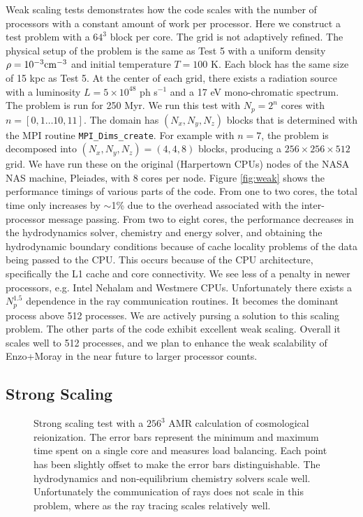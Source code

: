\documentclass[apj,onecolumn]{emulateapj}
\begin{document}
Weak scaling tests demonstrates how the code scales with the number of
processors with a constant amount of work per processor.  Here we
construct a test problem with a $64^3$ block per core.  The grid is
not adaptively refined.  The physical setup of the problem is the same
as Test 5 with a uniform density $\rho = 10^{-3} \cubecm$ and initial
temperature $T = 100$ K.  Each block has the same size of 15 kpc as
Test 5.  At the center of each grid, there exists a radiation source
with a luminosity $L = 5 \times 10^{48}$ ph s$^{-1}$ and a 17 eV
mono-chromatic spectrum.  The problem is run for 250 Myr.  We run this
test with $N_p = 2^n$ cores with $n = [0,1 \dots 10,11]$.  The domain
has $(N_x, N_y, N_z)$ blocks that is determined with the MPI routine
\texttt{MPI\_Dims\_create}.  For example with $n = 7$, the problem is
decomposed into $(N_x, N_y, N_z) = (4,4,8)$ blocks, producing a $256
\times 256 \times 512$ grid.  We have run these on the original
(Harpertown CPUs) nodes of the NASA NAS machine, Pleiades, with 8
cores per node.  Figure \ref{fig:weak} shows the performance timings
of various parts of the code.  From one to two cores, the total time
only increases by $\sim$1\% due to the overhead associated with the
inter-processor message passing.  From two to eight cores, the
performance decreases in the hydrodynamics solver, chemistry and
energy solver, and obtaining the hydrodynamic boundary conditions
because of cache locality problems of the data being passed to the
CPU.  This occurs because of the CPU architecture, specifically the L1
cache and core connectivity.  We see less of a penalty in newer
processors, e.g. Intel Nehalam and Westmere CPUs.  Unfortunately there
exists a $N_p^{1.5}$ dependence in the ray communication routines.  It
becomes the dominant process above 512 processes.  We are actively
pursing a solution to this scaling problem.  The other parts of the
code exhibit excellent weak scaling.  Overall it scales well to 512
processes, and we plan to enhance the weak scalability of Enzo+Moray
in the near future to larger processor counts.

\subsection{Strong Scaling}
\label{sec:strong_sc}

\begin{figure}[t]
  \caption{\label{fig:strong} Strong scaling test with a $256^3$ AMR
    calculation of cosmological reionization.  The error bars
    represent the minimum and maximum time spent on a single core and
    measures load balancing.  Each point has been slightly offset to
    make the error bars distinguishable.  The hydrodynamics and
    non-equilibrium chemistry solvers scale well.  Unfortunately the
    communication of rays does not scale in this problem, where as the
    ray tracing scales relatively well.}
\end{figure}
\end{document}

